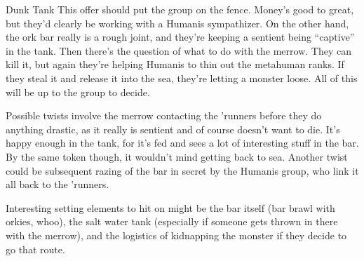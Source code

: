 \begin{scenario}{Dunk Tank}
\notes  This offer should put the group on the fence. Money's good to great, but they'd clearly be working with a Humanis sympathizer. On the other hand, the ork bar really is a rough joint, and they're keeping a sentient being ``captive'' in the tank. Then there's the question of what to do with the merrow. They can kill it, but again they're helping Humanis to thin out the metahuman ranks. If they steal it and release it into the sea, they're letting a monster loose. All of this will be up to the group to decide.

Possible twists involve the merrow contacting the 'runners before they do anything drastic, as it really is sentient and of course doesn't want to die. It's happy enough in the tank, for it's fed and sees a lot of interesting stuff in the bar. By the same token though, it wouldn't mind getting back to sea. Another twist could be subsequent razing of the bar in secret by the Humanis group, who link it all back to the 'runners.

Interesting setting elements to hit on might be the bar itself (bar brawl with orkies, whoo), the salt water tank (especially if someone gets thrown in there with the merrow), and the logistics of kidnapping the monster if they decide to go that route. 

\end{scenario}